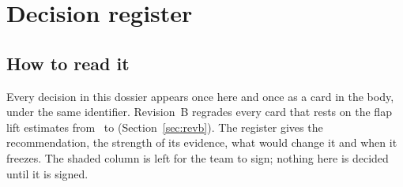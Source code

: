 \section{Decision register}
\subsection{How to read it}
Every decision in this dossier appears once here and once as a card in the body, under the same identifier. Revision~B regrades every card that rests on the flap lift estimates from \gC\ to \gE (Section~\ref{sec:revb}). The register gives the recommendation, the strength of its evidence, what would change it and when it freezes. The shaded column is left for the team to sign; nothing here is decided until it is signed.

